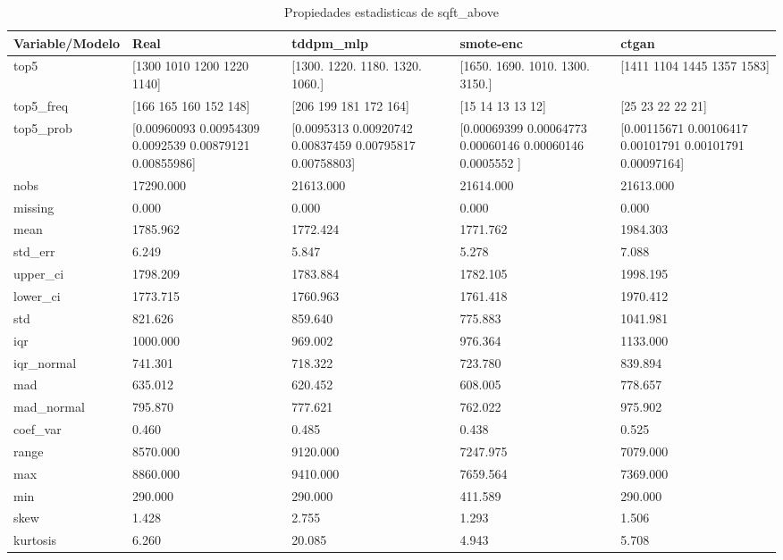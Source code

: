 \begin{table}[H]
\centering
\caption{Propiedades  estadisticas de sqft_above}
\label{table-stats-sqft_above}
\begin{tabular}{|l|m{10em}|m{10em}|m{10em}|m{10em}|}
\hline
 \rowcolor[gray]{0.8}
Variable/Modelo & Real & tddpm\_mlp & smote-enc & ctgan \\
\hline top5 & [1300 1010 1200 1220 1140] & [1300. 1220. 1180. 1320. 1060.] & [1650. 1690. 1010. 1300. 3150.] & [1411 1104 1445 1357 1583] \\
\hline top5\_freq & [166 165 160 152 148] & [206 199 181 172 164] & [15 14 13 13 12] & [25 23 22 22 21] \\
\hline top5\_prob & [0.00960093 0.00954309 0.0092539  0.00879121 0.00855986] & [0.0095313  0.00920742 0.00837459 0.00795817 0.00758803] & [0.00069399 0.00064773 0.00060146 0.00060146 0.0005552 ] & [0.00115671 0.00106417 0.00101791 0.00101791 0.00097164] \\
\hline nobs & 17290.000 & 21613.000 & 21614.000 & 21613.000 \\
\hline missing & 0.000 & 0.000 & 0.000 & 0.000 \\
\hline mean & 1785.962 & 1772.424 & 1771.762 & 1984.303 \\
\hline std\_err & 6.249 & 5.847 & 5.278 & 7.088 \\
\hline upper\_ci & 1798.209 & 1783.884 & 1782.105 & 1998.195 \\
\hline lower\_ci & 1773.715 & 1760.963 & 1761.418 & 1970.412 \\
\hline std & 821.626 & 859.640 & 775.883 & 1041.981 \\
\hline iqr & 1000.000 & 969.002 & 976.364 & 1133.000 \\
\hline iqr\_normal & 741.301 & 718.322 & 723.780 & 839.894 \\
\hline mad & 635.012 & 620.452 & 608.005 & 778.657 \\
\hline mad\_normal & 795.870 & 777.621 & 762.022 & 975.902 \\
\hline coef\_var & 0.460 & 0.485 & 0.438 & 0.525 \\
\hline range & 8570.000 & 9120.000 & 7247.975 & 7079.000 \\
\hline max & 8860.000 & 9410.000 & 7659.564 & 7369.000 \\
\hline min & 290.000 & 290.000 & 411.589 & 290.000 \\
\hline skew & 1.428 & 2.755 & 1.293 & 1.506 \\
\hline kurtosis & 6.260 & 20.085 & 4.943 & 5.708 \\

\end{tabular}
\end{table}
